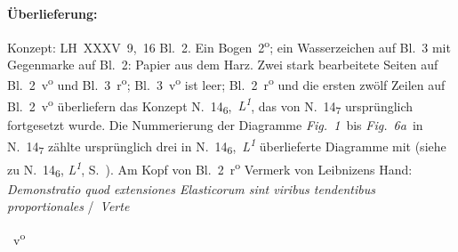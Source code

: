%
%
%
%
%
\frenchspacing%
%
\begin{ledgroupsized}[r]{120mm}%
\footnotesize%
\pstart%
\noindent%
\textbf{Überlieferung:}%
\pend%
\end{ledgroupsized}%
\begin{ledgroupsized}[r]{114mm}%
\footnotesize%
\pstart%
\parindent -6mm%
%
Konzept: LH~XXXV~9,~16 Bl.~2.
Ein Bogen~2\textsuperscript{o};
ein Wasserzeichen auf Bl.~3 mit Gegenmarke auf Bl.~2:
Papier aus dem Harz.
Zwei stark bearbeitete Seiten auf Bl.~2~v\textsuperscript{o}\! und Bl.~3~r\textsuperscript{o};
Bl.~3~v\textsuperscript{o} ist leer;
Bl.~2~r\textsuperscript{o} und die ersten zwölf Zeilen auf Bl.~2~v\textsuperscript{o} überliefern das Konzept N.~14\textsubscript{6},~\textit{L\textsuperscript{1}},
das von N.~14\textsubscript{7} ursprünglich fortgesetzt wurde.
Die Nummerierung der Diagramme \lbrack\textit{Fig.~1}\rbrack\ bis \lbrack\textit{Fig.~6a}\rbrack\ in N.~14\textsubscript{7} zählte ursprünglich drei in N.~14\textsubscript{6},~\textit{L\textsuperscript{1}} überlieferte Diagramme mit %
(siehe zu N.~14\textsubscript{6}, \textit{L\textsuperscript{1}}, S.~).
Am Kopf von Bl.~2~r\textsuperscript{o}\! Vermerk von Leibnizens Hand:
\textit{Demonstratio quod extensiones Elasticorum sint viribus tendentibus proportionales} \lbrack/\rbrack\ \textit{Verte}
\pend%
\end{ledgroupsized}%
%
%
%
%
\frenchspacing%
%
%
\count{}
\count{}
\count{}
%
%
\vspace{8mm}%
\pstart%
\normalsize%
\noindent%
%
~v\textsuperscript{o}\rbrack%
